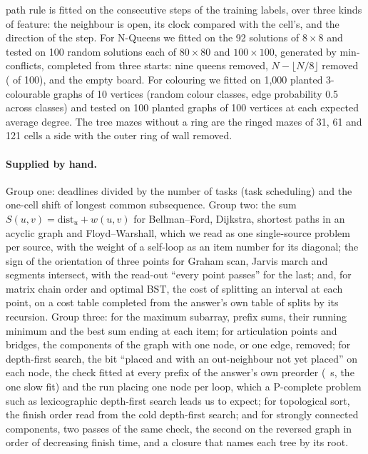 path rule is fitted on the  consecutive steps of the training labels, over three kinds of feature: the
neighbour is open, its clock compared with the cell's, and the direction of the step. For N-Queens we fitted on the 92
solutions of $8\times8$ and tested on 100 random solutions each of $80\times80$ and $100\times100$, generated by
min-conflicts, completed from three starts: nine queens removed, $N - \lfloor N/8 \rfloor$ removed ( of 100), and the
empty board. For colouring
we fitted on 1,000 planted 3-colourable graphs of 10 vertices (random colour classes, edge probability 0.5 across
classes) and tested on 100 planted graphs of 100 vertices at each expected average degree. The tree mazes without a ring
are the ringed mazes of 31, 61 and 121 cells a side with the outer ring of wall removed.

\paragraph{Supplied by hand.} Group one: deadlines divided by the number of tasks (task scheduling) and the one-cell
shift of longest common subsequence. Group two: the sum $S(u,v) = \mathrm{dist}_u + w(u,v)$ for Bellman--Ford, Dijkstra,
shortest paths in an acyclic graph and Floyd--Warshall, which we read as one single-source problem per source, with the
weight of a self-loop as an item number for its diagonal; the sign of the orientation of three points for Graham scan,
Jarvis march and segments intersect, with the read-out ``every point passes'' for the last; and, for matrix chain order
and optimal BST, the cost of splitting an interval at each point, on a cost table completed from the answer's
own table of splits by its recursion. Group three: for the maximum subarray, prefix sums, their running minimum and the
best sum ending at each item; for articulation points and bridges, the components of the graph with one node, or one
edge, removed; for depth-first search, the bit ``placed and with an out-neighbour not yet placed'' on each node, the check
fitted at every prefix of the answer's own preorder (~s, the one slow fit) and the run placing one
node per loop, which a P-complete problem such as lexicographic depth-first search\cite{anderson1987parallelism} leads
us to expect; for
topological sort, the finish order read from the cold depth-first search; and for strongly connected components, two
passes of the same check, the second on the reversed graph in order of decreasing finish time, and a closure that names
each tree by its root.

